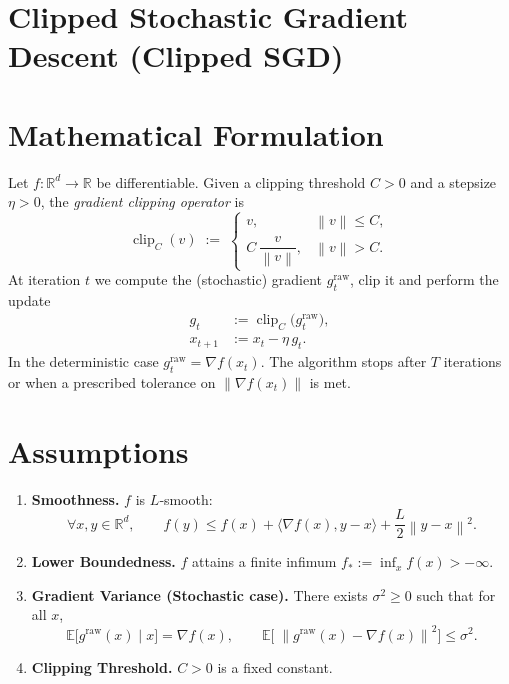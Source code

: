 \documentclass{article}
\newcommand{\norm}[1]{\left\lVert#1\right\rVert}
\newcommand{\E}{\mathbb{E}}
\begin{document}
\section*{Clipped Stochastic Gradient Descent (Clipped SGD)}

\section*{Mathematical Formulation}
Let $f:\mathbb{R}^{d}\!\to\!\mathbb{R}$ be differentiable.
Given a clipping threshold $C>0$ and a stepsize $\eta>0$, the
\emph{gradient clipping operator} is
\[
\operatorname{clip}_{C}(v)\;:=\;
\begin{cases}
v, & \norm{v}\le C,\\[4pt]
C\,\dfrac{v}{\norm{v}}, & \norm{v}>C .
\end{cases}
\]
At iteration $t$ we compute the (stochastic) gradient $g^{\text{raw}}_{t}$,
clip it and perform the update
\[
\boxed{
\begin{aligned}
g_{t} &:= \operatorname{clip}_{C}\!\bigl(g^{\text{raw}}_{t}\bigr),\\
x_{t+1} &:= x_{t}-\eta\,g_{t}.
\end{aligned}}
\tag{1}
\]
In the deterministic case $g^{\text{raw}}_{t}=\nabla f(x_{t})$.
The algorithm stops after $T$ iterations or when a prescribed tolerance on
$\norm{\nabla f(x_{t})}$ is met.

\section*{Assumptions}
\begin{enumerate}[label={A\arabic*},leftmargin=*,itemsep=2pt]
\item \textbf{Smoothness.} $f$ is $L$‑smooth:
\[
\forall x,y\in\mathbb{R}^{d},\qquad 
f(y)\le f(x)+\langle\nabla f(x),y-x\rangle+\frac{L}{2}\norm{y-x}^{2}.
\tag{A1}
\]
\item \textbf{Lower Boundedness.} $f$ attains a finite infimum 
$f_{*}:=\inf_{x}f(x)>-\infty$.
\item \textbf{Gradient Variance (Stochastic case).}
There exists $\sigma^{2}\ge0$ such that for all $x$,
\[
\E\!\bigl[g^{\text{raw}}(x)\mid x\bigr]=\nabla f(x),\qquad
\E\!\bigl[\;\norm{g^{\text{raw}}(x)-\nabla f(x)}^{2}\bigr]\le\sigma^{2}.
\tag{A3}
\]
\item \textbf{Clipping Threshold.} $C>0$ is a fixed constant.
\end{enumerate}
\end{document}
